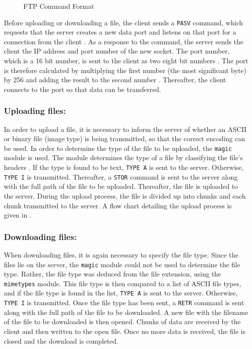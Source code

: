 \documentclass[10pt,twocolumn]{witseiepaper}
\begin{document}
\begin{figure}[h]
	\centering
	\caption{FTP Command Format}
	\label{fig:commandformat}
\end{figure}

Before uploading or downloading a file, the client sends a \texttt{PASV} command, which requests that the server creates a new data port and listens on that port for a connection from the client \cite{rfc}. As a response to the command, the server sends the client the IP address and port number of the new socket. The port number, which is a 16 bit number, is sent to the client as two eight bit numbers  \cite{rfc}. The port is therefore calculated by multiplying the first number (the most significant byte) by 256 and adding the result to the second number \cite{rfc}. Thereafter, the client connects to the port so that data can be transferred.

\subsubsection*{Uploading files:}
In order to upload a file, it is necessary to inform the server of whether an ASCII or binary file (image type) is being transmitted, so that the correct encoding can be used. In order to determine the type of the file to be uploaded, the \texttt{magic} module is used. The module determines the type of a file by classifying the file's headers \cite{magic}. If the type is found to be text, \texttt{TYPE A} is sent to the server. Otherwise, \texttt{TYPE I} is transmitted. Thereafter, a \texttt{STOR} command is sent to the server along with the full path of the file to be uploaded. Thereafter, the file is uploaded to the server. During the upload process, the file is divided up into chunks and each chunk transmitted to the server. A flow chart detailing the upload process is given in .

\subsubsection*{Downloading files:}
When downloading files, it is again necessary to specify the file type. Since the files lie on the server, the \texttt{magic} module could not be used to determine the file type. Rather, the file type was deduced from the file extension, using the \texttt{mimetypes} module. This file type is then compared to a list of ASCII file types, and if the file type is found in the list, \texttt{TYPE A} is sent to the server. Otherwise, \texttt{TYPE I} is transmitted. Once the file type has been sent, a \texttt{RETR} command is sent along with the full path of the file to be downloaded. A new file with the filename of the file to be downloaded is then opened. Chunks of data are received by the client and then written to the open file. Once no more data is received, the file is closed and the download is completed.
\end{document}
